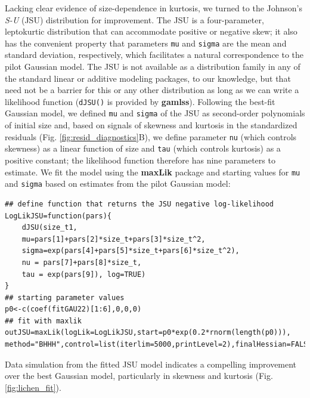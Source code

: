 \documentclass[12pt]{article}
\begin{document}
Lacking clear evidence of size-dependence in kurtosis, we turned to the Johnson's \emph{S-U} (JSU) distribution for improvement. 
The JSU is a four-parameter, leptokurtic distribution that can accommodate positive or negative skew; it also has the convenient property that parameters \texttt{mu} and \texttt{sigma} are the mean and standard deviation, respectively, which facilitates a natural correspondence to the pilot Gaussian model. 
The JSU is not available as a distribution family in any of the standard linear or additive modeling packages, to our knowledge, but that need not be a barrier for this or any other distribution as long as we can write a likelihood function (\texttt{dJSU()} is provided by \textbf{gamlss}). 
Following the best-fit Gaussian model, we defined \texttt{mu} and \texttt{sigma} of the JSU as second-order polynomials of initial size and, based on signals of skewness and kurtosis in the standardized residuals (Fig. \ref{fig:resid_diagnostics}B), we define parameter \texttt{nu} (which controls skewness) as a linear function of size and \texttt{tau} (which controls kurtosis) as a positive constant; the likelihood function therefore has nine parameters to estimate.
We fit the model using the \textbf{maxLik} package and starting values for \texttt{mu} and \texttt{sigma} based on estimates from the pilot Gaussian model:
\begin{lstlisting}
## define function that returns the JSU negative log-likelihood
LogLikJSU=function(pars){
	dJSU(size_t1, 
	mu=pars[1]+pars[2]*size_t+pars[3]*size_t^2,
	sigma=exp(pars[4]+pars[5]*size_t+pars[6]*size_t^2),
	nu = pars[7]+pars[8]*size_t,
	tau = exp(pars[9]), log=TRUE)
}
## starting parameter values
p0<-c(coef(fitGAU22)[1:6],0,0,0)
## fit with maxlik
outJSU=maxLik(logLik=LogLikJSU,start=p0*exp(0.2*rnorm(length(p0))),
method="BHHH",control=list(iterlim=5000,printLevel=2),finalHessian=FALSE); 
\end{lstlisting}
Data simulation from the fitted JSU model indicates a compelling improvement over the best Gaussian model, particularly in skewness and kurtosis (Fig. \ref{fig:lichen_fit}). 
\end{document}
